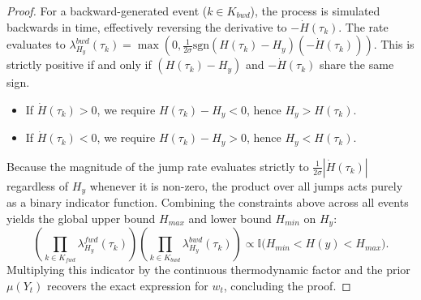 \documentclass{article}
\begin{document}
\begin{proof}
    For a backward-generated event ($k \in K_{bwd}$), the process is simulated backwards in time, effectively reversing the derivative to $-\dot{H}(\tau_k)$. The rate evaluates to $\lambda_{H_y}^{bwd}(\tau_k) = \max\left(0, \frac{1}{2\sigma}\text{sgn}(H(\tau_k) - H_y)(-\dot{H}(\tau_k))\right)$. This is strictly positive if and only if $(H(\tau_k) - H_y)$ and $-\dot{H}(\tau_k)$ share the same sign.
    \begin{itemize}
        \item If $\dot{H}(\tau_k) > 0$, we require $H(\tau_k) - H_y < 0$, hence $H_y > H(\tau_k)$.
        \item If $\dot{H}(\tau_k) < 0$, we require $H(\tau_k) - H_y > 0$, hence $H_y < H(\tau_k)$.
    \end{itemize}

    Because the magnitude of the jump rate evaluates strictly to $\frac{1}{2\sigma}|\dot{H}(\tau_k)|$ regardless of $H_y$ whenever it is non-zero, the product over all jumps acts purely as a binary indicator function. Combining the constraints above across all events yields the global upper bound $H_{max}$ and lower bound $H_{min}$ on $H_y$:
    \begin{equation}
        \left(\prod_{k \in K_{fwd}} \lambda_{H_y}^{fwd}(\tau_k)\right) \left(\prod_{k \in K_{bwd}} \lambda_{H_y}^{bwd}(\tau_k)\right) \propto \mathbb{I}\big(H_{min} < H(y) < H_{max}\big).
    \end{equation}
    Multiplying this indicator by the continuous thermodynamic factor and the prior $\mu(Y_t)$ recovers the exact expression for $w_t$, concluding the proof.
\end{proof}
\end{document}
